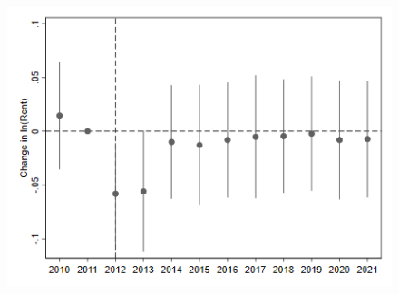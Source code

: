 \documentclass[12pt]{article}
\begin{document}
{{{{{{{{{\begin{figure}
\begin{center}
\includegraphics[scale=0.6]{Street Easy Rents/R18 High Surge Tall Build old.png}
\label{fig:tallage}
\end{center}
\end{figure}


}}}}}}}}}
\end{document}
